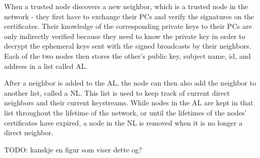 
When a trusted node discovers a new neighbor, which is a trusted node in the
network - they first have to exchange their \acp{PC} and verify the signatures
on the certificates. Their knowledge of the corresponding private keys to their
\acp{PC} are only indirectly verified because they need to know the private key
in order to decrypt the ephemeral keys sent with the signed broadcasts by their
neighbors. Each of the two nodes then stores the other's public key, subject
name, id, and address in a list called \ac{AL}.


After a neighbor is added to the \ac{AL}, the node can then also add the
neighbor to another list, called a \ac{NL}. This list is used to keep
track of current direct neighbors and their current keystreams. While nodes in
the \ac{AL} are kept in that list throughout the lifetime of the network, or
until the lifetimes of the nodes' certificates have expired, a node in the
\ac{NL} is removed when it is no longer a direct neighbor. 

TODO: kanskje en figur som viser dette og?

